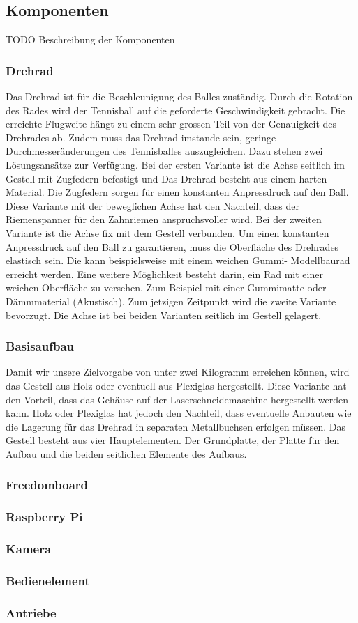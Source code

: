 \subsection{Komponenten}
TODO Beschreibung der Komponenten
\subsubsection{Drehrad}

Das Drehrad ist für die Beschleunigung des Balles zuständig. Durch die Rotation des Rades wird der Tennisball auf die geforderte Geschwindigkeit gebracht. Die erreichte Flugweite hängt zu einem sehr grossen Teil von der Genauigkeit des Drehrades ab. Zudem muss das Drehrad imstande sein, geringe Durchmesseränderungen des Tennisballes auszugleichen. Dazu stehen zwei Lösungsansätze zur Verfügung. Bei der ersten Variante ist die Achse seitlich im Gestell mit Zugfedern befestigt und Das Drehrad besteht aus einem harten Material. Die Zugfedern sorgen für einen konstanten Anpressdruck auf den Ball. Diese Variante mit der beweglichen Achse hat den Nachteil, dass der Riemenspanner für den Zahnriemen anspruchsvoller wird. Bei der zweiten Variante ist die Achse fix mit dem Gestell verbunden. Um einen konstanten Anpressdruck auf den Ball zu garantieren, muss die Oberfläche des Drehrades elastisch sein. Die kann beispielsweise mit einem weichen Gummi- Modellbaurad erreicht werden. Eine weitere Möglichkeit besteht darin, ein Rad mit einer weichen Oberfläche zu versehen. Zum Beispiel mit einer Gummimatte oder Dämmmaterial (Akustisch). Zum jetzigen Zeitpunkt wird die zweite Variante bevorzugt. Die Achse ist bei beiden Varianten seitlich im Gestell gelagert. 
\subsubsection{Basisaufbau}
Damit wir unsere Zielvorgabe von unter zwei Kilogramm erreichen können, wird das Gestell aus Holz oder eventuell aus Plexiglas hergestellt. Diese Variante hat den Vorteil, dass das Gehäuse auf der Laserschneidemaschine hergestellt werden kann. Holz oder Plexiglas hat jedoch den Nachteil, dass eventuelle Anbauten wie die Lagerung für das Drehrad in separaten Metallbuchsen erfolgen müssen. Das Gestell besteht aus vier Hauptelementen. Der Grundplatte, der Platte für den Aufbau und die beiden seitlichen Elemente des Aufbaus.

\subsubsection{Freedomboard}


\subsubsection{Raspberry Pi}


\subsubsection{Kamera}


\subsubsection{Bedienelement}


\subsubsection{Antriebe}
